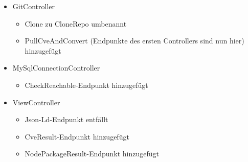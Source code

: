 \begin{itemize}
        \item GitController \label{api_controller:one}
            \begin{itemize}
                \item Clone zu CloneRepo umbenannt
                \item PullCveAndConvert (Endpunkte des ersten Controllers sind nun hier) hinzugefügt
            \end{itemize}
        \item MySqlConnectionController \label{api_controller_2:five}
            \begin{itemize}
                \item CheckReachable-Endpunkt hinzugefügt
            \end{itemize}
        \item ViewController \label{api_controller:four}
            \begin{itemize}
                \item Json-Ld-Endpunkt entfällt
                \item CveResult-Endpunkt hinzugefügt
                \item NodePackageResult-Endpunkt hinzugefügt
            \end{itemize}
           
    \end{itemize}